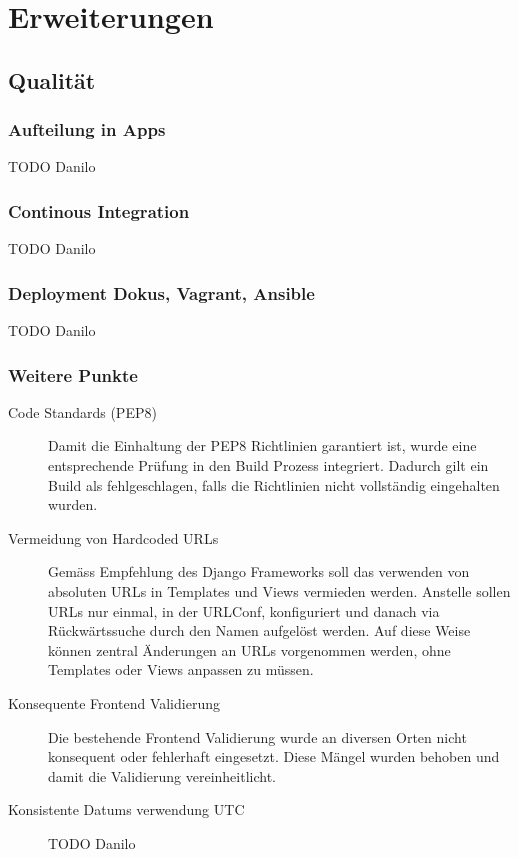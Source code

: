 \section{Erweiterungen}

\subsection{Qualität}

\subsubsection{Aufteilung in Apps}
TODO Danilo
\subsubsection{Continous Integration}
TODO Danilo
\subsubsection{Deployment Dokus, Vagrant, Ansible}
TODO Danilo

\subsubsection{Weitere Punkte}
\begin{description}
\item[Code Standards (PEP8)] Damit die Einhaltung der PEP8 Richtlinien
garantiert ist, wurde eine entsprechende Prüfung in den Build Prozess
integriert. Dadurch gilt ein Build als fehlgeschlagen, falls die Richtlinien
nicht vollständig eingehalten wurden.

\item[Vermeidung von Hardcoded URLs] Gemäss Empfehlung des Django Frameworks
soll das verwenden von absoluten URLs in Templates und Views vermieden werden.
Anstelle sollen URLs nur einmal, in der URLConf, konfiguriert und danach via
Rückwärtssuche durch den Namen aufgelöst werden. Auf diese Weise können zentral
Änderungen an URLs vorgenommen werden, ohne Templates oder Views anpassen zu
müssen.

\item[Konsequente Frontend Validierung] Die bestehende Frontend Validierung
wurde an diversen Orten nicht konsequent oder fehlerhaft eingesetzt. Diese
Mängel wurden behoben und damit die Validierung vereinheitlicht.

\item[Konsistente Datums verwendung UTC]
TODO Danilo
\end{description}

